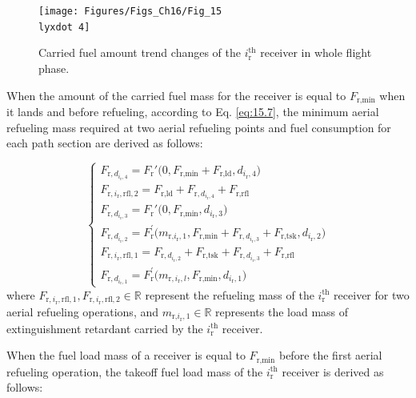 \begin{figure}
	\begin{centering}
		\texttt{[image: Figures/Figs\_Ch16/Fig\_15\\lyxdot 4]}
		\par\end{centering}
	\caption{Carried fuel amount trend changes of the $i_{\text{r}}^{\text{th}}$ receiver in whole flight phase.}
	\centering{}\label{Fig_15.4}
\end{figure}

When the amount of the carried fuel mass for the receiver is equal to $F_{\text{r,min}}$  when it lands and before refueling, according to Eq. \ref{eq:15.7}, the minimum aerial refueling mass required at two aerial refueling points and fuel consumption for each path section are derived as follows:

\begin{equation}
\begin{cases}F_{\text{r},d_{i_\text{r},4}}=F_{\text{r}}'\Big(0,F_{\text{r},\text{min}}+F_{\text{r},\text{l}\text{d}},d_{i_\text{r},4}\Big)\\F_{\text{r},i_{\text{r}},\text{r}\text{f}\text{l},2}=F_{\text{r},\text{l}\text{d}}+F_{\text{r},d_{i_\text{r},4}}+F_{\text{r},\text{r}\text{f}\text{l}}\\F_{\text{r},d_{i_\text{r},3}}=F_{\text{r}}'\Big(0,F_{\text{r},\text{min}},d_{i_{\text{r}},3}\Big)\\F_{\text{r},d_{i_\text{r},2}}=F_{\text{r}}^{\prime}\Big(m_{\text{r,}i_{\text{r}},1},F_{\text{r,min}}+F_{\text{r},d_{i_\text{r},3}}+F_{\text{r,tsk}},d_{i_{\text{r}},2}\Big)\\F_{\text{r},i_\text{r},\text{r}\text{f}\text{l},1}=F_{\text{r},d_{i_\text{r},2}}+F_{\text{r},\text{tsk}}+F_{\text{r},d_{i_\text{r},3}}+F_{\text{r},\text{rfl}}\\F_{\text{r},d_{i_\text{r},1}}=F_{\text{r}}^{\prime}\Big(m_{\text{r},i_{\text{r}},l},F_{\text{r},\text{min}},d_{i_{\text{r}},1}\Big)\end{cases}
\label{eq:15.14}
\end{equation}
where $F_{\text{r},i_\text{r},\text{r}\text{f}\text{l},1},F_{\text{r},i_\text{r},\text{r}\text{f}\text{l},2}\in\mathbb{R}$  represent the refueling mass of the $i_{\text{r}}^{\text{th}}$  receiver for two aerial refueling operations, and $ m_{\text{r,}i_{\text{r}},1}\in\mathbb{R} $ represents the load mass of extinguishment retardant carried by the $i_{\text{r}}^{\text{th}}$  receiver.

When the fuel load mass of a receiver is equal to  $F_\text{r,min}$ before the first aerial refueling operation, the takeoff fuel load mass of the $i_{\text{r}}^{\text{th}}$ receiver is derived as follows:

